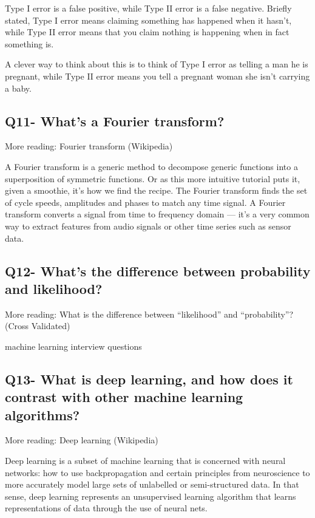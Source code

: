 \documentclass[11pt,a4paper]{article}
\begin{document}
Type I error is a false positive, while Type II error is a false negative. Briefly stated, Type I error means claiming something has happened when it hasn’t, while Type II error means that you claim nothing is happening when in fact something is.

A clever way to think about this is to think of Type I error as telling a man he is pregnant, while Type II error means you tell a pregnant woman she isn’t carrying a baby.

\subsection{Q11- What’s a Fourier transform?}

More reading: Fourier transform (Wikipedia)

A Fourier transform is a generic method to decompose generic functions into a superposition of symmetric functions. Or as this more intuitive tutorial puts it, given a smoothie, it’s how we find the recipe. The Fourier transform finds the set of cycle speeds, amplitudes and phases to match any time signal. A Fourier transform converts a signal from time to frequency domain — it’s a very common way to extract features from audio signals or other time series such as sensor data.

\subsection{Q12- What’s the difference between probability and likelihood?}

More reading: What is the difference between “likelihood” and “probability”? (Cross Validated)

machine learning interview questions

\subsection{Q13- What is deep learning, and how does it contrast with other machine learning algorithms?}

More reading: Deep learning (Wikipedia)

Deep learning is a subset of machine learning that is concerned with neural networks: how to use backpropagation and certain principles from neuroscience to more accurately model large sets of unlabelled or semi-structured data. In that sense, deep learning represents an unsupervised learning algorithm that learns representations of data through the use of neural nets.
\end{document}
